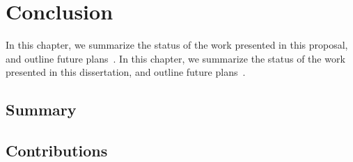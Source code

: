 \chapter{Conclusion\label{chap:conclusion}}

\if@ms
In this chapter, we summarize the status of the work presented in this proposal, and outline future plans~\cite{template}.
\else
In this chapter, we summarize the status of the work presented in this dissertation, and outline future plans~\cite{template}.
\fi

\section{Summary\label{sec:conclusion:summary}}

\section{Contributions\label{sec:conclusion:contributions}}
